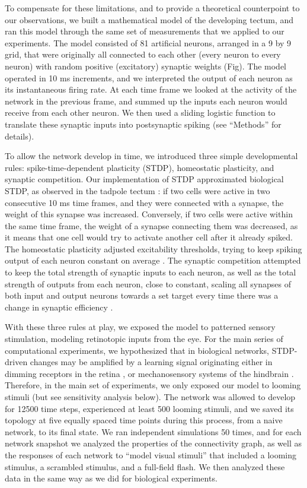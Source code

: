 \documentclass{article}
\begin{document}
To compensate for these limitations, and to provide a theoretical counterpoint to our observations, we built a mathematical model of the developing tectum, and ran this model through the same set of measurements that we applied to our experiments. The model consisted of 81 artificial neurons, arranged in a 9 by 9 grid, that were originally all connected to each other (every neuron to every neuron) with random positive (excitatory) synaptic weights (Fig). The model operated in 10 ms increments, and we interpreted the output of each neuron as its instantaneous firing rate. At each time frame we looked at the activity of the network in the previous frame, and summed up the inputs each neuron would receive from each other neuron. We then used a sliding logistic function to translate these synaptic inputs into postsynaptic spiking (see “Methods” for details).

To allow the network develop in time, we introduced three simple developmental rules: spike-time-dependent plasticity (STDP), homeostatic plasticity, and synaptic competition. Our implementation of STDP approximated biological STDP, as observed in the tadpole tectum \citep{zhang1998stdp,mu2006stdp}: if two cells were active in two consecutive 10 ms time frames, and they were connected with a synapse, the weight of this synapse was increased. Conversely, if two cells were active within the same time frame, the weight of a synapse connecting them was decreased, as it means that one cell would try to activate another cell after it already spiked. The homeostatic plasticity adjusted excitability thresholds, trying to keep spiking output of each neuron constant on average \citep{pratt2007intrinsic,turrigiano2011}. The synaptic competition attempted to keep the total strength of synaptic inputs to each neuron, as well as the total strength of outputs from each neuron, close to constant, scaling all synapses of both input and output neurons towards a set target every time there was a change in synaptic efficiency \citep{hamodi2016nmda,cohen2002synreview,munz2014hebbian}.

With these three rules at play, we exposed the model to patterned sensory stimulation, modeling retinotopic inputs from the eye. For the main series of computational experiments, we hypothesized that in biological networks, STDP-driven changes may be amplified by a learning signal \citep{savin2014stdpreward,aswolinskiy2015stdpreward} originating either in dimming receptors in the retina \citep{baranauskas2012}, or mechanosensory systems of the hindbrain \citep{pratt2009multisens,felch2016,truszkowski2017}. Therefore, in the main set of experiments, we only exposed our model to looming stimuli (but see sensitivity analysis below). The network was allowed to develop for 12500 time steps, experienced at least 500 looming stimuli, and we saved its topology at five equally spaced time points during this process, from a naive network, to its final state. We ran independent simulations 50 times, and for each network snapshot we analyzed the properties of the connectivity graph, as well as the responses of each network to “model visual stimuli” that included a looming stimulus, a scrambled stimulus, and a full-field flash. We then analyzed these data in the same way as we did for biological experiments.
\end{document}
